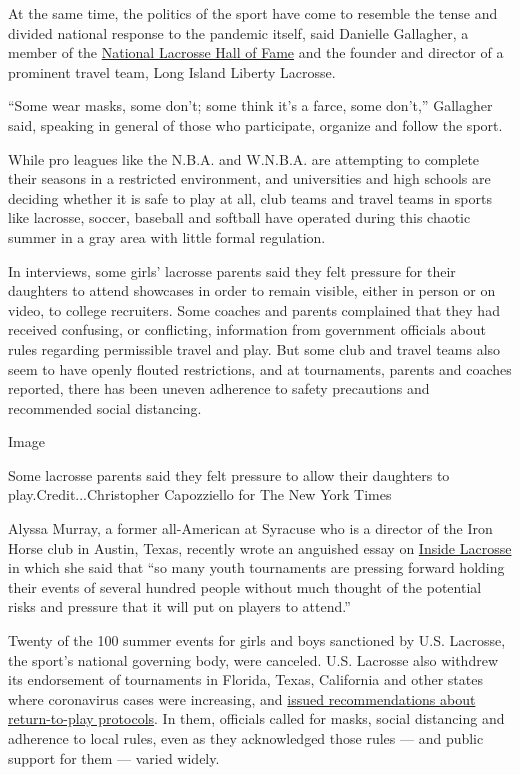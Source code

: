 At the same time, the politics of the sport have come to resemble the
tense and divided national response to the pandemic itself, said
Danielle Gallagher, a member of the
\href{https://www.uslacrosse.org/about-us-lacrosse/hall-of-fame}{National
Lacrosse Hall of Fame} and the founder and director of a prominent
travel team, Long Island Liberty Lacrosse.

``Some wear masks, some don't; some think it's a farce, some don't,''
Gallagher said, speaking in general of those who participate, organize
and follow the sport.

While pro leagues like the N.B.A. and W.N.B.A. are attempting to
complete their seasons in a restricted environment, and universities and
high schools are deciding whether it is safe to play at all, club teams
and travel teams in sports like lacrosse, soccer, baseball and softball
have operated during this chaotic summer in a gray area with little
formal regulation.

In interviews, some girls' lacrosse parents said they felt pressure for
their daughters to attend showcases in order to remain visible, either
in person or on video, to college recruiters. Some coaches and parents
complained that they had received confusing, or conflicting, information
from government officials about rules regarding permissible travel and
play. But some club and travel teams also seem to have openly flouted
restrictions, and at tournaments, parents and coaches reported, there
has been uneven adherence to safety precautions and recommended social
distancing.

Image

Some lacrosse parents said they felt pressure to allow their daughters
to play.Credit...Christopher Capozziello for The New York Times

Alyssa Murray, a former all-American at Syracuse who is a director of
the Iron Horse club in Austin, Texas, recently wrote an anguished essay
on
\href{https://www.insidelacrosse.com/article/murray-a-message-from-a-confused-club-director-/56633}{Inside
Lacrosse} in which she said that ``so many youth tournaments are
pressing forward holding their events of several hundred people without
much thought of the potential risks and pressure that it will put on
players to attend.''

Twenty of the 100 summer events for girls and boys sanctioned by U.S.
Lacrosse, the sport's national governing body, were canceled. U.S.
Lacrosse also withdrew its endorsement of tournaments in Florida, Texas,
California and other states where coronavirus cases were increasing, and
\href{https://www.uslacrosse.org/return-to-play}{issued recommendations
about return-to-play protocols}. In them, officials called for masks,
social distancing and adherence to local rules, even as they
acknowledged those rules --- and public support for them --- varied
widely.

